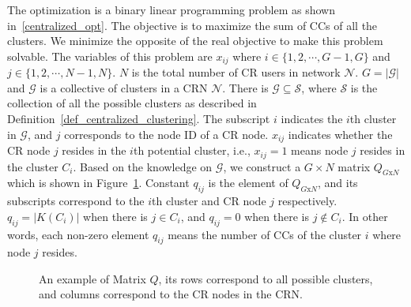 \documentclass[10pt,journal,compsoc]{IEEEtran}
\theoremstyle{mytheoremstyle}
\theoremstyle{mytheoremstyle}
\theoremstyle{mytheoremstyle}
\newcommand{\ie}{i.e., }
\begin{document}
The optimization is a binary linear programming problem as shown in~\ref{centralized_opt}.
The objective is to maximize the sum of CCs of all the clusters.
We minimize the opposite of the real objective to make this problem solvable.
%
The variables of this problem are $x_{ij}$ where $i\in \{1,2,\cdots,G-1, G\}$ and $j\in \{1,2,\cdots,N-1, N\}$.
$N$ is the total number of CR users in network $\mathcal{N}$.
$G = |\mathcal{G}|$ and $\mathcal{G}$ is a collective of clusters in a CRN $\mathcal{N}$.
There is $\mathcal{G} \subseteq \mathcal{S}$, where $\mathcal{S}$ is the collection of all the possible clusters as described in Definition~\ref{def_centralized_clustering}.
The subscript $i$ indicates the $i$th cluster in $\mathcal{G}$, and $j$ corresponds to the node ID of a CR node. 
$x_{ij}$ indicates whether the CR node $j$ resides in the $i$th potential cluster, \ie $x_{ij}=1$ means node $j$ resides in the cluster $C_i$. 
%
Based on the knowledge on $\mathcal{G}$, we construct a $G\times N$ matrix $Q_{G\text{x}N}$ which is shown in Figure~\ref{costant_matrix_Q}. 
Constant $q_{ij}$ is the element of $Q_{G\text{x}N}$, and its subscripts correspond to the $i$th cluster and CR node $j$ respectively.
$q_{ij}= |K(C_i)|$ when there is $j\in C_i$, and $q_{ij}= 0$ when there is $j\notin C_i$.
In other words, each non-zero element $q_{ij}$ means the number of CCs of the cluster $i$ where node $j$ resides.




\begin{figure}[ht!]
\centering
{}	
\caption{An example of Matrix $Q$, its rows correspond to all possible clusters, and columns correspond to the CR nodes in the CRN. }
\label{costant_matrix_Q}
\end{figure}
\end{document}
